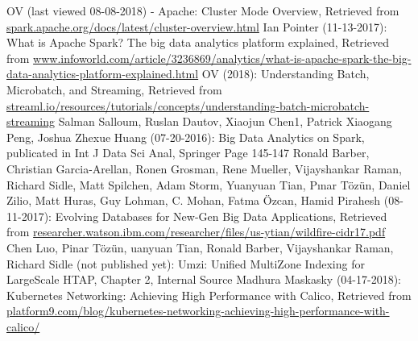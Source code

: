 \begin{thebibliography}{..........}
   	OV (last viewed 08-08-2018) - Apache:
                              	Cluster Mode Overview,
                              	Retrieved from \url{spark.apache.org/docs/latest/cluster-overview.html}
   	Ian Pointer (11-13-2017):
 				What is Apache Spark? The big data analytics platform explained,
                              	Retrieved from \url{www.infoworld.com/article/3236869/analytics/what-is-apache-spark-the-big-data-analytics-platform-explained.html}
   	OV (2018):
   				Understanding Batch, Microbatch, and Streaming,
                              	Retrieved from \url{streaml.io/resources/tutorials/concepts/understanding-batch-microbatch-streaming}
   	Salman Salloum, Ruslan Dautov, Xiaojun Chen1, Patrick Xiaogang Peng, Joshua Zhexue Huang (07-20-2016):
   				Big Data Analytics on Spark,
   				publicated in Int J Data Sci Anal, Springer
                              	Page 145-147
   	Ronald Barber, Christian Garcia-Arellan, Ronen Grosman, Rene Mueller, Vijayshankar Raman, Richard Sidle, Matt Spilchen, Adam Storm, Yuanyuan Tian, Pınar Tözün, Daniel Zilio, Matt Huras, Guy Lohman, C. Mohan, Fatma Özcan, Hamid Pirahesh (08-11-2017):
				Evolving Databases for New-Gen Big Data Applications,
   				Retrieved from \url{researcher.watson.ibm.com/researcher/files/us-ytian/wildfire-cidr17.pdf}      	
   	Chen Luo, Pinar Tözün, uanyuan Tian, Ronald Barber, Vijayshankar Raman, Richard Sidle (not published yet):
				Umzi: Unified MultiZone Indexing for LargeScale HTAP,
				Chapter 2,
   				Internal Source
   	Madhura Maskasky (04-17-2018): 
   				Kubernetes Networking: Achieving High Performance with Calico,
   				Retrieved from  \url{platform9.com/blog/kubernetes-networking-achieving-high-performance-with-calico/}
\end{thebibliography}